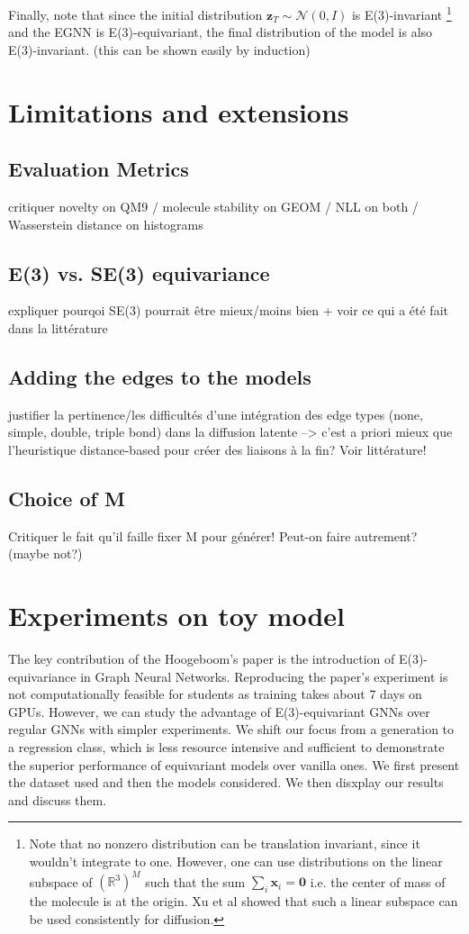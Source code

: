 \documentclass[sigconf]{acmart}
\begin{document}
Finally, note that since the initial distribution $\mathbf{z}_T \sim \mathcal{N}(0, I)$ is E(3)-invariant
\footnote{Note that no nonzero distribution can be translation invariant, since it wouldn't integrate to one. 
However, one can use distributions on the linear subspace of $(\mathbb{R}^3)^M$ such that the sum $\sum_i \mathbf{x}_i = \mathbf{0}$ i.e. the center of mass of the molecule is at the origin.
Xu et al \cite{xu} showed that such a linear subspace can be used consistently for diffusion.}
and the EGNN is E(3)-equivariant, the final distribution of the model is also E(3)-invariant. (this can be shown easily by induction)

\section{Limitations and extensions} %
\subsection{Evaluation Metrics}
critiquer novelty on QM9 / molecule stability on GEOM / NLL on both / Wasserstein distance on histograms
\subsection{E(3) vs. SE(3) equivariance}
expliquer pourqoi SE(3) pourrait être mieux/moins bien + voir ce qui a été fait dans la littérature
\subsection{Adding the edges to the models}
justifier la pertinence/les difficultés d'une intégration des edge types (none, simple, double, triple bond) dans la diffusion latente --> c'est a priori mieux que l'heuristique distance-based pour créer des liaisons à la fin? Voir littérature!
\subsection{Choice of M}
Critiquer le fait qu'il faille fixer M pour générer! Peut-on faire autrement? (maybe not?)

\section{Experiments on toy model}
The key contribution of the Hoogeboom's paper is the introduction of E(3)-equivariance in Graph Neural Networks.
Reproducing the paper's experiment is not computationally feasible for students as training takes about 7 days on GPUs. However, we can study the advantage of E(3)-equivariant GNNs over regular GNNs with simpler experiments. We shift our focus from a generation to a regression class, which is less resource intensive and sufficient to demonstrate the superior performance of equivariant models over vanilla ones.
We first present the dataset used and then the models considered. We then disxplay our results and discuss them.
\end{document}
